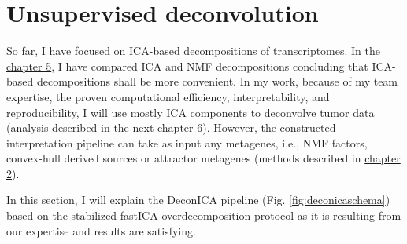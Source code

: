 \documentclass[12pt,]{book}
\theoremstyle{definition}
\theoremstyle{definition}
\theoremstyle{definition}
\theoremstyle{remark}
\begin{document}
\hypertarget{unsupervised-deconvolution}{%
\section{Unsupervised deconvolution}\label{unsupervised-deconvolution}}

So far, I have focused on ICA-based decompositions of transcriptomes. In
the \protect\hyperlink{nmfica}{chapter 5}, I have compared ICA and NMF
decompositions concluding that ICA-based decompositions shall be more
convenient. In my work, because of my team expertise, the proven
computational efficiency, interpretability, and reproducibility, I will
use mostly ICA components to deconvolve tumor data (analysis described
in the next \protect\hyperlink{results}{chapter 6}). However, the
constructed interpretation pipeline can take as input any metagenes,
i.e., NMF factors, convex-hull derived sources or attractor metagenes
(methods described in \protect\hyperlink{methods}{chapter 2}).

In this section, I will explain the DeconICA pipeline (Fig.
\ref{fig:deconicaschema}) based on the stabilized fastICA
overdecomposition protocol as it is resulting from our expertise and
results are satisfying.
\end{document}
